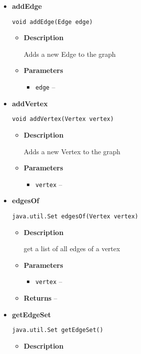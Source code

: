 {{{{{\begin{itemize}
{\begin{itemize}
{Adds a new Edge to the graph
}
\end{itemize}
}%
\item{ 
{\bf  addEdge}\\
\begin{lstlisting}[frame=none]
void addEdge(Edge edge)\end{lstlisting} %
\begin{itemize}
\item{
{\bf  Description}

Adds a new Edge to the graph
}
\item{
{\bf  Parameters}
  \begin{itemize}
   \item{
\texttt{edge} -- }
  \end{itemize}
}%
\end{itemize}
}%
\item{ 
{\bf  addVertex}\\
\begin{lstlisting}[frame=none]
void addVertex(Vertex vertex)\end{lstlisting} %
\begin{itemize}
\item{
{\bf  Description}

Adds a new Vertex to the graph
}
\item{
{\bf  Parameters}
  \begin{itemize}
   \item{
\texttt{vertex} -- }
  \end{itemize}
}%
\end{itemize}
}%
\item{ 
{\bf  edgesOf}\\
\begin{lstlisting}[frame=none]
java.util.Set edgesOf(Vertex vertex)\end{lstlisting} %
\begin{itemize}
\item{
{\bf  Description}

get a list of all edges of a vertex
}
\item{
{\bf  Parameters}
  \begin{itemize}
   \item{
\texttt{vertex} -- }
  \end{itemize}
}%
\item{{\bf  Returns} -- 
 
}%
\end{itemize}
}%
\item{ 
{\bf  getEdgeSet}\\
\begin{lstlisting}[frame=none]
java.util.Set getEdgeSet()\end{lstlisting} %
\begin{itemize}
\item{
{\bf  Description}

}
\end{itemize}}
\end{itemize}}}}}}
